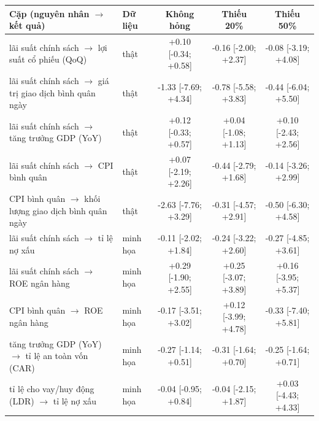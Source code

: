 \begin{tabular}{llccc}
\toprule
Cặp (nguyên nhân $\to$ kết quả) & Dữ liệu & Không hỏng & Thiếu 20\% & Thiếu 50\%\\
\midrule
lãi suất chính sách $\to$ lợi suất cổ phiếu (QoQ) & thật & +0.10 [-0.34; +0.58] & -0.16 [-2.00; +2.37] & -0.08 [-3.19; +4.08] \\
lãi suất chính sách $\to$ giá trị giao dịch bình quân ngày & thật & -1.33 [-7.69; +4.34] & -0.78 [-5.58; +3.83] & -0.44 [-6.04; +5.50] \\
lãi suất chính sách $\to$ tăng trưởng GDP (YoY) & thật & +0.12 [-0.33; +0.57] & +0.04 [-1.08; +1.13] & +0.10 [-2.43; +2.56] \\
lãi suất chính sách $\to$ CPI bình quân & thật & +0.07 [-2.19; +2.26] & -0.44 [-2.79; +1.68] & -0.14 [-3.26; +2.99] \\
CPI bình quân $\to$ khối lượng giao dịch bình quân ngày & thật & -2.63 [-7.76; +3.29] & -0.31 [-4.57; +2.91] & -0.50 [-6.30; +4.58] \\
lãi suất chính sách $\to$ tỉ lệ nợ xấu & minh họa & -0.11 [-2.02; +1.84] & -0.24 [-3.22; +2.60] & -0.27 [-4.85; +3.61] \\
lãi suất chính sách $\to$ ROE ngân hàng & minh họa & +0.29 [-1.90; +2.55] & +0.25 [-3.07; +3.89] & +0.16 [-3.95; +5.37] \\
CPI bình quân $\to$ ROE ngân hàng & minh họa & -0.17 [-3.51; +3.02] & +0.12 [-3.99; +4.78] & -0.33 [-7.40; +5.81] \\
tăng trưởng GDP (YoY) $\to$ tỉ lệ an toàn vốn (CAR) & minh họa & -0.27 [-1.14; +0.51] & -0.31 [-1.64; +0.70] & -0.25 [-1.64; +0.71] \\
tỉ lệ cho vay/huy động (LDR) $\to$ tỉ lệ nợ xấu & minh họa & -0.04 [-0.95; +0.84] & -0.04 [-2.15; +1.87] & +0.03 [-4.43; +4.33] \\
\bottomrule
\end{tabular}
